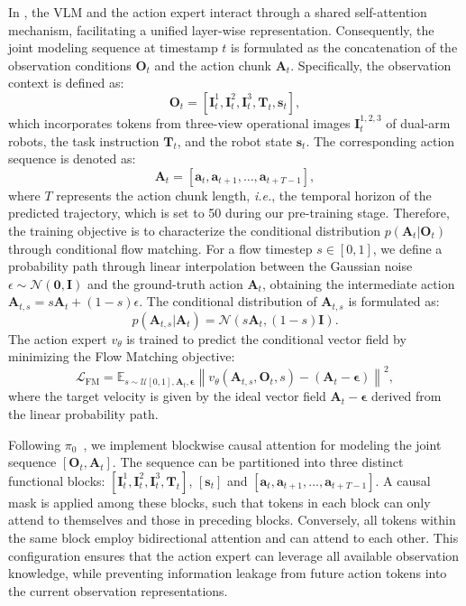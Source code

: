 In \method, the VLM and the action expert interact through a shared self-attention mechanism, facilitating a unified layer-wise representation. Consequently, the joint modeling sequence at timestamp $t$ is formulated as the concatenation of the observation conditions $\mathbf{O}_t$ and the action chunk $\mathbf{A}_t$. 
Specifically, the observation context is defined as:
\begin{equation}
    \mathbf{O}_t = [\mathbf{I}_t^1, \mathbf{I}_t^2, \mathbf{I}_t^3, \mathbf{T}_t, \mathbf{s}_t],
\end{equation}
which incorporates tokens from three-view operational images $\mathbf{I}_t^{1,2,3}$ of dual-arm robots, the task instruction $\mathbf{T}_t$, and the robot state $\mathbf{s}_t$. The corresponding action sequence is denoted as:
\begin{equation}
    \mathbf{A}_t = [\mathbf{a}_t, \mathbf{a}_{t+1}, \dots, \mathbf{a}_{t+T-1}],
\end{equation}
where $T$ represents the action chunk length, \textit{i.e.}, the temporal horizon of the predicted trajectory, which is set to 50 during our pre-training stage. Therefore, the training objective is to characterize the conditional distribution $p(\mathbf{A}_t | \mathbf{O}_t)$ through conditional flow matching. For a flow timestep $s \in [0, 1]$, we define a probability path through linear interpolation between the Gaussian noise $\epsilon \sim \mathcal{N}(\mathbf{0}, \mathbf{I})$ and the ground-truth action $\mathbf{A}_t$, obtaining the intermediate action $\mathbf{A}_{t, s}=s\mathbf{A}_{t}+(1-s)\epsilon$. The conditional distribution of $\mathbf{A}_{t, s}$ is formulated as:
\begin{equation}
    p(\mathbf{A}_{t, s} | \mathbf{A}_t) = \mathcal{N}(s\mathbf{A}_{t}, (1-s)\mathbf{I}).
\end{equation}
The action expert $v_\theta$ is trained to predict the conditional vector field by minimizing the Flow Matching objective:
\begin{equation}
    \mathcal{L}_{\text{FM}} = \mathbb{E}_{s \sim \mathcal{U}[0, 1], \mathbf{A}_t, \mathbf\epsilon} \left\| v_\theta(\mathbf{A}_{t, s}, \mathbf{O}_t, s) - (\mathbf{A}_t - \mathbf\epsilon) \right\|^2,
\end{equation}
where the target velocity is given by the ideal vector field $\mathbf{A}_t - \mathbf\epsilon$ derived from the linear probability path.

Following $\pi_0$~\cite{pi_0}, we implement blockwise causal attention for modeling the joint sequence $[\mathbf{O}_t, \mathbf{A}_t]$. The sequence can be partitioned into three distinct functional blocks: $[\mathbf{I}_t^1, \mathbf{I}_t^2, \mathbf{I}_t^3, \mathbf{T}_t]$, $[\mathbf{s}_t]$ and $[\mathbf{a}_t, \mathbf{a}_{t+1}, \dots, \mathbf{a}_{t+T-1}]$.
A causal mask is applied among these blocks, such that tokens in each block can only attend to themselves and those in preceding blocks. Conversely, all tokens within the same block employ bidirectional attention and can attend to each other. This configuration ensures that the action expert can leverage all available observation knowledge, while preventing information leakage from future action tokens into the current observation representations.

